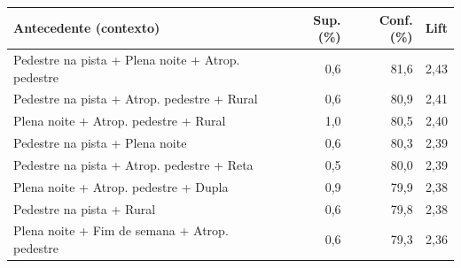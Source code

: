\begin{tabular}{@{}>{\raggedright\arraybackslash}p{7.3cm}rrr@{}}
\toprule
\textbf{Antecedente (contexto)} & \textbf{Sup. (\%)} & \textbf{Conf. (\%)} & \textbf{Lift} \\
\midrule
Pedestre na pista + Plena noite + Atrop. pedestre & 0,6 & 81,6 & 2,43 \\
Pedestre na pista + Atrop. pedestre + Rural & 0,6 & 80,9 & 2,41 \\
Plena noite + Atrop. pedestre + Rural & 1,0 & 80,5 & 2,40 \\
Pedestre na pista + Plena noite & 0,6 & 80,3 & 2,39 \\
Pedestre na pista + Atrop. pedestre + Reta & 0,5 & 80,0 & 2,39 \\
Plena noite + Atrop. pedestre + Dupla & 0,9 & 79,9 & 2,38 \\
Pedestre na pista + Rural & 0,6 & 79,8 & 2,38 \\
Plena noite + Fim de semana + Atrop. pedestre & 0,6 & 79,3 & 2,36 \\
\bottomrule
\end{tabular}